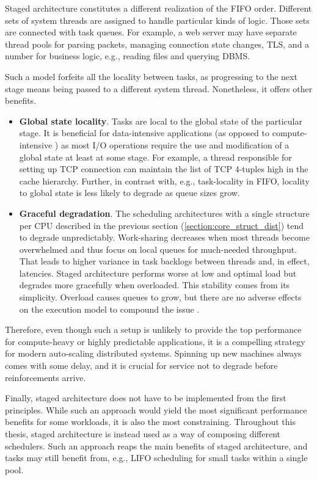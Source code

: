 \documentclass[12pt,a4paper,twoside]{report}
\begin{document}
Staged architecture \cite{Welsh2001} constitutes a different realization of the FIFO order. Different sets of system threads are assigned to handle particular kinds of logic. Those sets are connected with task queues. For example, a web server may have separate thread pools for parsing packets, managing connection state changes, TLS, and a number for business logic, e.g., reading files and querying DBMS.

Such a model forfeits all the locality between tasks, as progressing to the next stage means being passed to a different system thread. Nonetheless, it offers other benefits. 
\begin{itemize}
    \item \textbf{Global state locality}. Tasks are local to the global state of the particular stage. It is beneficial for data-intensive applications (as opposed to compute-intensive \cite{Kleppmann2017-en}) as most I/O operations require the use and modification of a global state at least at some stage. For example, a thread responsible for setting up TCP connection can maintain the list of TCP 4-tuples high in the cache hierarchy. Further, in contrast with, e.g., task-locality in FIFO, locality to global state is less likely to degrade as queue sizes grow.
    \item \textbf{Graceful degradation}. The scheduling architectures with a single structure per CPU described in the previous section (\ref{section:core_struct_dist}) tend to degrade unpredictably. Work-sharing decreases when most threads become overwhelmed and thus focus on local queues for much-needed throughput. That leads to higher variance in task backlogs between threads and, in effect, latencies. Staged architecture performs worse at low and optimal load but degrades more gracefully when overloaded. This stability comes from its simplicity. Overload causes queues to grow, but there are no adverse effects on the execution model to compound the issue \cite{Welsh2001}.
\end{itemize}

Therefore, even though such a setup is unlikely to provide the top performance for compute-heavy or highly predictable applications, it is a compelling strategy for modern auto-scaling distributed systems. Spinning up new machines always comes with some delay, and it is crucial for service not to degrade before reinforcements arrive.

\label{section:staged-as-composition}
Finally, staged architecture does not have to be implemented from the first principles. While such an approach would yield the most significant performance benefits for some workloads, it is also the most constraining. Throughout this thesis, staged architecture is instead used as a way of composing different schedulers. Such an approach reaps the main benefits of staged architecture, and tasks may still benefit from, e.g., LIFO scheduling for small tasks within a single pool. 
\end{document}
